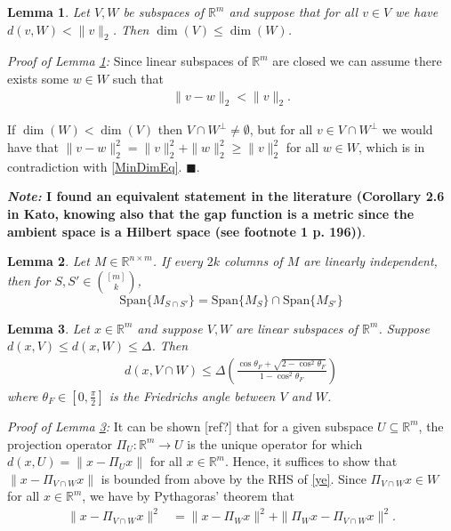 \documentclass[journal,onecolumn]{IEEEtran}
\newtheorem{lemma}{Lemma}
\begin{document}

\begin{lemma}\label{MinimalDimensionLemma}
Let $V,W$ be subspaces of $\mathbb{R}^m$ and suppose that for all $v \in V$ we have $d(v, W) < \|v\|_2$. Then $\dim(V) \leq  \dim(W)$.
\end{lemma}

\emph{Proof of Lemma \ref{MinimalDimensionLemma}:} Since linear subspaces of $\mathbb{R}^m$ are closed we can assume there exists some $w \in W$ such that
\begin{align}\label{MinDimEq}
\|v - w\|_2 < \|v\|_2.
\end{align}

If $\dim(W) < \dim(V)$ then $V \cap W^\perp \neq \emptyset$, but for all $v \in V \cap W^\perp$ we would have that $\|v - w\|_2^2 = \|v\|_2^2 + \|w\|_2^2 \geq \|v\|_2^2$ for all $w \in W$, which is in contradiction with \eqref{MinDimEq}. \indent $\blacksquare$.

\textbf{\emph{Note:} I found an equivalent statement in the literature (Corollary 2.6 in Kato, knowing also that the gap function is a metric since the ambient space is a Hilbert space (see footnote 1 p. 196))}.


\begin{lemma}\label{SpanIntersectionLemma}
Let $M \in \mathbb{R}^{n \times m}$. If every $2k$ columns of $M$ are linearly independent, then for $S,S' \in {[m] \choose k}$,
\begin{equation}
\text{Span}\{M_{S \cap S'}\} = \text{Span}\{M_{S}\} \cap \text{Span}\{M_{S'}\}
\end{equation}
\end{lemma}


\begin{lemma}\label{DistanceToIntersectionLemma}
Let $x \in \mathbb{R}^m$ and suppose $V, W$ are linear subspaces of $\mathbb{R}^m$. Suppose $d(x,V) \leq d(x,W) \leq \Delta$. Then
\begin{align}\label{ye}
d(x, V \cap W) \leq \Delta \left( \frac{ \cos\theta_F + \sqrt{2 - \cos^2\theta_F} }{1 - \cos^2\theta_F} \right)
\end{align}
%
where $\theta_F \in [0, \frac{\pi}{2}]$ is the Friedrichs angle between $V$ and $W$. 
\end{lemma}

\emph{Proof of Lemma \ref{DistanceToIntersectionLemma}:} It can be shown [ref?] that for a given subspace $U \subseteq \mathbb{R}^m$, the projection operator $\Pi_U: \mathbb{R}^m \to U$ is the unique operator for which $d(x, U) = \|x - \Pi_U x\|$ for all $x \in \mathbb{R}^m$. Hence, it suffices to show that $\|x - \Pi_{V \cap W}x\|$ is bounded from above by the RHS of \eqref{ye}. Since $\Pi_{V \cap W}x \in W$ for all $x \in \mathbb{R}^m$, we have by Pythagoras' theorem that
\begin{align}\label{7.1}
\|x - \Pi_{V \cap W}x\|^2 &= \|x - \Pi_W x\|^2 + \|\Pi_Wx - \Pi_{V \cap W} x\|^2.
\end{align}
\end{document}
